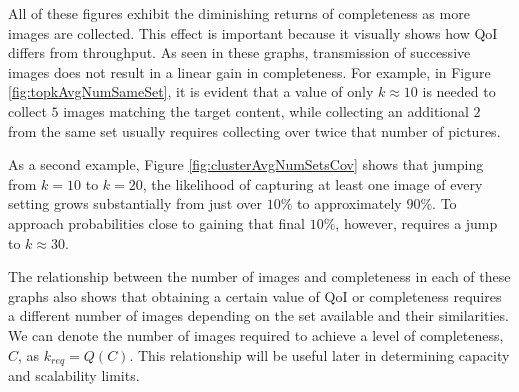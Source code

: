 All of these figures exhibit the diminishing returns of completeness as more images are collected.  This effect is important because it visually shows how QoI differs from throughput.  As seen in these graphs, transmission of successive images does not result in a linear gain in completeness.  For example, in Figure \ref{fig:topkAvgNumSameSet}, it is evident that a value of only $k \approx 10$ is needed to collect $5$ images matching the target content, while collecting an additional $2$ from the same set usually requires collecting over twice that number of pictures.  

As a second example, Figure \ref{fig:clusterAvgNumSetsCov} shows that jumping from $k=10$ to $k=20$, the likelihood of capturing at least one image of every setting grows substantially from just over $10\%$ to approximately $90\%$.  To approach probabilities close to gaining that final $10\%$, however, requires a jump to $k\approx30$.  

%

The relationship between the number of images and completeness in each of these graphs also shows that obtaining a certain value of QoI or completeness requires a different number of images depending on the set available and their similarities.  We can denote the number of images required to achieve a level of completeness, $C$, as $k_{req} = Q(C)$.  This relationship will be useful later in determining capacity and scalability limits.

